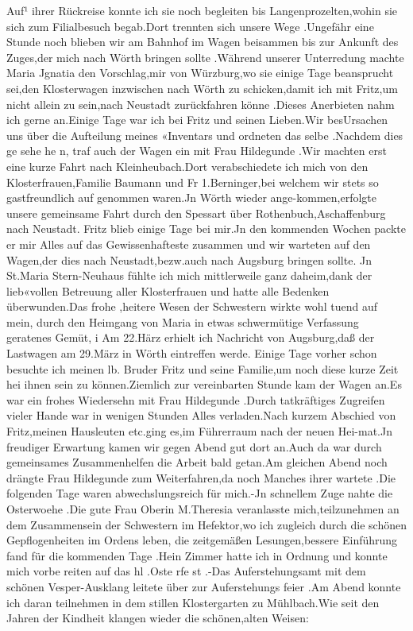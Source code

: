 \documentclass[a4paper,11pt]{article}
\begin{document}
Auf¹ ihrer Rückreise konnte ich sie noch begleiten bis Langenprozelten,wohin sie sich zum Filialbesuch begab.Dort trennten sich unsere Wege .Ungefähr eine Stunde noch blieben wir am Bahnhof im Wagen beisammen bis zur Ankunft des Zuges,der mich nach Wörth bringen sollte .Während unserer Unterredung machte Maria Jgnatia den Vorschlag,mir von Würzburg,wo sie einige Tage beansprucht sei,den Klosterwagen inzwischen nach Wörth zu schicken,damit ich mit Fritz,um nicht allein zu sein,nach Neustadt zurückfahren könne .Dieses Anerbieten nahm ich gerne an.Einige Tage war ich bei Fritz und seinen Lieben.Wir besUrsachen uns über die Aufteilung meines «Inventars und ordneten das selbe .Nachdem dies ge sehe he n, traf auch der Wagen ein mit Frau Hildegunde .Wir machten erst eine kurze Fahrt nach Kleinheubach.Dort verabschiedete ich mich von den Klosterfrauen,Familie Baumann und Fr 1.Berninger,bei welchem wir stets so gastfreundlich auf genommen waren.Jn Wörth wieder ange-kommen,erfolgte unsere gemeinsame Fahrt durch den Spessart über Rothenbuch,Aschaffenburg nach Neustadt. Fritz blieb einige Tage bei mir.Jn den kommenden Wochen packte er mir Alles auf das Gewissenhafteste zusammen und wir warteten auf den Wagen,der dies nach Neustadt,bezw.auch nach Augsburg bringen sollte. Jn St.Maria Stern-Neuhaus fühlte ich mich mittlerweile ganz daheim,dank der lieb«vollen Betreuung aller Klosterfrauen und hatte alle Bedenken überwunden.Das frohe ,heitere Wesen der Schwestern wirkte wohl tuend auf mein, durch den Heimgang von Maria in etwas schwermütige Verfassung geratenes Gemüt, i Am 22.Härz erhielt ich Nachricht von Augsburg,daß der Lastwagen am 29.März in Wörth eintreffen werde. Einige Tage vorher schon besuchte ich meinen lb. Bruder Fritz und seine Familie,um noch diese kurze Zeit hei ihnen sein zu können.Ziemlich zur vereinbarten Stunde kam der Wagen an.Es war ein frohes Wiedersehn mit Frau Hildegunde .Durch tatkräftiges Zugreifen vieler Hande war in wenigen Stunden Alles verladen.Nach kurzem Abschied von Fritz,meinen Hausleuten etc.ging es,im Führerraum nach der neuen Hei-mat.Jn freudiger Erwartung kamen wir gegen Abend gut dort an.Auch da war durch gemeinsames Zusammenhelfen die Arbeit bald getan.Am gleichen Abend noch drängte Frau Hildegunde zum Weiterfahren,da noch Manches ihrer wartete .Die folgenden Tage waren abwechslungsreich für mich.-Jn schnellem Zuge nahte die Osterwoehe .Die gute Frau Oberin M.Theresia veranlasste mich,teilzunehmen an dem Zusammensein der Schwestern im Hefektor,wo ich zugleich durch die schönen Gepflogenheiten im Ordens leben, die zeitgemäßen Lesungen,bessere Einführung fand für die kommenden Tage .Hein Zimmer hatte ich in Ordnung und konnte mich vorbe reiten auf das hl .Oste rfe st .-Das Auferstehungsamt mit dem schönen Vesper-Ausklang leitete über zur Auferstehungs feier .Am Abend konnte ich daran teilnehmen in dem stillen Klostergarten zu Mühlbach.Wie seit den Jahren der Kindheit klangen wieder die schönen,alten Weisen:
\end{document}
